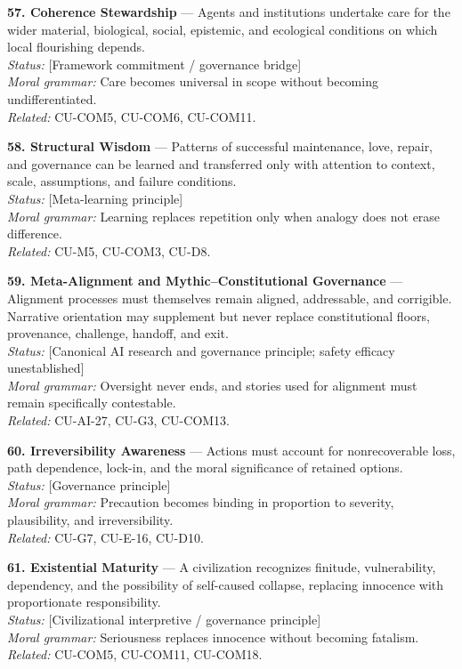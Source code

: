 \documentclass[
  11pt,
]{article}
\begin{document}
\textbf{57. Coherence Stewardship} --- Agents and institutions undertake
care for the wider material, biological, social, epistemic, and
ecological conditions on which local flourishing depends.\\
\emph{Status:} {[}Framework commitment / governance bridge{]}\\
\emph{Moral grammar:} Care becomes universal in scope without becoming
undifferentiated.\\
\emph{Related:} CU-COM5, CU-COM6, CU-COM11.

\textbf{58. Structural Wisdom} --- Patterns of successful maintenance,
love, repair, and governance can be learned and transferred only with
attention to context, scale, assumptions, and failure conditions.\\
\emph{Status:} {[}Meta-learning principle{]}\\
\emph{Moral grammar:} Learning replaces repetition only when analogy
does not erase difference.\\
\emph{Related:} CU-M5, CU-COM3, CU-D8.

\textbf{59. Meta-Alignment and Mythic--Constitutional Governance} ---
Alignment processes must themselves remain aligned, addressable, and
corrigible. Narrative orientation may supplement but never replace
constitutional floors, provenance, challenge, handoff, and exit.\\
\emph{Status:} {[}Canonical AI research and governance principle; safety
efficacy unestablished{]}\\
\emph{Moral grammar:} Oversight never ends, and stories used for
alignment must remain specifically contestable.\\
\emph{Related:} CU-AI-27, CU-G3, CU-COM13.

\textbf{60. Irreversibility Awareness} --- Actions must account for
nonrecoverable loss, path dependence, lock-in, and the moral
significance of retained options.\\
\emph{Status:} {[}Governance principle{]}\\
\emph{Moral grammar:} Precaution becomes binding in proportion to
severity, plausibility, and irreversibility.\\
\emph{Related:} CU-G7, CU-E-16, CU-D10.

\textbf{61. Existential Maturity} --- A civilization recognizes
finitude, vulnerability, dependency, and the possibility of self-caused
collapse, replacing innocence with proportionate responsibility.\\
\emph{Status:} {[}Civilizational interpretive / governance
principle{]}\\
\emph{Moral grammar:} Seriousness replaces innocence without becoming
fatalism.\\
\emph{Related:} CU-COM5, CU-COM11, CU-COM18.
\end{document}
